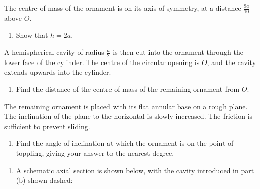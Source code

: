 \documentclass[leqno]{article}
\begin{document}
\begin{enumerate}[
  label=\textbf{\arabic*.},
  leftmargin=*,
  topsep=0pt,
  partopsep=0pt,
  parsep=0pt
]
The centre of mass of the ornament is on its axis of symmetry, at a distance $\frac{9a}{10}$ above $O$. \\
\begin{enumerate}[label=\textbf{(\alph*)}]
\item Show that $h=2a$.  \\
\end{enumerate}
A hemispherical cavity of radius $\frac{a}{2}$ is then cut into the ornament through the lower face of the cylinder. The centre of the circular opening is $O$, and the cavity extends upwards into the cylinder. \\
\begin{enumerate}[label=\textbf{(\alph*)}, resume]
\item Find the distance of the centre of mass of the remaining ornament from $O$.  \\
\end{enumerate}
The remaining ornament is placed with its flat annular base on a rough plane. The inclination of the plane to the horizontal is slowly increased. The friction is sufficient to prevent sliding. \\
\begin{enumerate}[label=\textbf{(\alph*)}, resume]
\item Find the angle of inclination at which the ornament is on the point of toppling, giving your answer to the nearest degree.  \\
\end{enumerate}

\vspace*{10pt}

\begin{djsSolution}
\begin{enumerate}[label=\textbf{(\alph*)}, start=1]
\item A schematic axial section is shown below, with the cavity introduced in part (b) shown dashed:\par\nopagebreak



\end{enumerate}
\end{djsSolution}
\end{enumerate}
\end{document}

